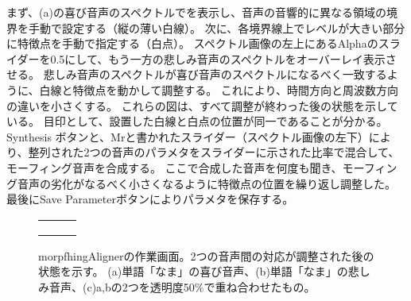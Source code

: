まず、(a)の喜び音声のスペクトルでを表示し、音声の音響的に異なる領域の境界を手動で設定する（縦の薄い白線）。
次に、各境界線上でレベルが大きい部分に特徴点を手動で指定する（白点）。
スペクトル画像の左上にあるAlphaのスライダーを0.5にして、もう一方の悲しみ音声のスペクトルをオーバーレイ表示させる。
悲しみ音声のスペクトルが喜び音声のスペクトルになるべく一致するように、白線と特徴点を動かして調整する。
これにより、時間方向と周波数方向の違いを小さくする。
これらの図は、すべて調整が終わった後の状態を示している。
目印として、設置した白線と白点の位置が同一であることが分かる。
Synthesis ボタンと、Mrと書かれたスライダー（スペクトル画像の左下）により、整列された2つの音声のパラメタをスライダーに示された比率で混合して、
モーフィング音声を合成する。
ここで合成した音声を何度も聞き、モーフィング音声の劣化がなるべく小さくなるように特徴点の位置を繰り返し調整した。
最後にSave Parameterボタンによりパラメタを保存する。



\begin{figure}[t]
  \vspace{-50pt}
  \centering

  \begin{tabular}{ccc}
  \begin{minipage} {0.8\hsize}
  \centering
  \includegraphics [ width = 1\columnwidth]{Figure/Appendix/6B/MorphAli_hap.eps}
  \subcaption{}
  \end{minipage}\\
  
  \begin{minipage} {0.8\hsize}
  \centering
  \includegraphics [ width = 1\columnwidth]{Figure/Appendix/6B/MorphAli_sad.eps}
  \subcaption{}
  \end{minipage}\\

  \begin{minipage} {0.8\hsize}
  \centering
  \includegraphics [ width = 1\columnwidth]{Figure/Appendix/6B/MorphAli_50.eps}
  \subcaption{}
  \end{minipage} 
  
  \end{tabular}
  
  \caption{morpfhingAlignerの作業画面。2つの音声間の対応が調整された後の状態を示す。
           (a)単語「なま」の喜び音声、(b)単語「なま」の悲しみ音声、(c)a,bの2つを透明度50\%で重ね合わせたもの。
          }
  \label{fig:morphAli} 

\end{figure}

